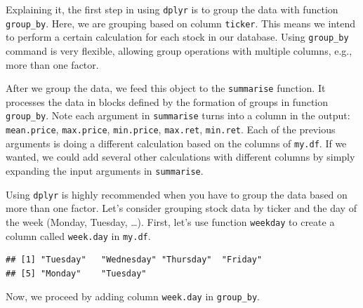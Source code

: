 \documentclass[11pt,]{book}
\newenvironment{Shaded}{\begin{snugshade}}{\end{snugshade}}
\newcommand{\KeywordTok}[1]{\textcolor[rgb]{0.27,0.27,0.27}{\textbf{#1}}}
\newcommand{\StringTok}[1]{\textcolor[rgb]{0.5,0.5,0.5}{#1}}
\newcommand{\CommentTok}[1]{\textcolor[rgb]{0.56,0.35,0.01}{\textit{#1}}}
\newcommand{\OperatorTok}[1]{\textcolor[rgb]{0.81,0.36,0.00}{\textbf{#1}}}
\newcommand{\NormalTok}[1]{#1}
\begin{document}
Explaining it, the first step in using \texttt{dplyr} is to group the
data with function \texttt{group\_by}. Here, we are grouping based on
column \texttt{ticker}. This means we intend to perform a certain
calculation for each stock in our database. Using \texttt{group\_by}
command is very flexible, allowing group operations with multiple
columns, e.g., more than one factor.

After we group the data, we feed this object to the \texttt{summarise}
function. It processes the data in blocks defined by the formation of
groups in function \texttt{group\_by}. Note each argument in
\texttt{summarise} turns into a column in the output:
\texttt{mean.price}, \texttt{max.price}, \texttt{min.price},
\texttt{max.ret}, \texttt{min.ret}. Each of the previous arguments is
doing a different calculation based on the columns of \texttt{my.df}. If
we wanted, we could add several other calculations with different
columns by simply expanding the input arguments in \texttt{summarise}.

Using \texttt{dplyr} is highly recommended when you have to group the
data based on more than one factor. Let's consider grouping stock data
by ticker and the day of the week (Monday, Tuesday, \ldots{}). First,
let's use function \texttt{weekday} to create a column called
\texttt{week.day} in \texttt{my.df}. 

\begin{Shaded}
\end{Shaded}

\begin{verbatim}
## [1] "Tuesday"   "Wednesday" "Thursday"  "Friday"   
## [5] "Monday"    "Tuesday"
\end{verbatim}

Now, we proceed by adding column \texttt{week.day} in
\texttt{group\_by}.
\end{document}
